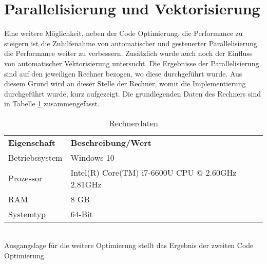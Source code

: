 \section{Parallelisierung und Vektorisierung}
Eine weitere Möglichkeit, neben der Code Optimierung, die Performance zu steigern ist die Zuhilfenahme von automatischer und gesteuerter Parallelisierung \cite{Kessler.Wintersemester201718}  die Performance weiter zu verbessern. Zusätzlich wurde auch noch der Einfluss von automatischer Vektorisierung untersucht. Die Ergebnisse der Parallelisierung sind auf den jeweiligen Rechner bezogen, wo diese durchgeführt wurde. Aus diesem Grund wird an dieser Stelle der Rechner, womit die Implementierung durchgeführt wurde, kurz aufgezeigt. Die grundlegenden Daten des Rechners sind in Tabelle \ref{tab:Rechnerdaten} zusammengefasst.
\begin{table}[h]
	\centering	\begin{tabular}{l p{10cm}}
		\textbf{Eigenschaft} & \textbf{Beschreibung/Wert}\\
		Betriebssystem & Windows 10\\
		Prozessor & Intel(R) Core(TM) i7-6600U CPU @ 2.60GHz 2.81GHz\\
		RAM & 8 GB\\
		Systemtyp & 64-Bit 
	\end{tabular}
	\caption{Rechnerdaten}
	\label{tab:Rechnerdaten}
\end{table}\\
Ausgangslage für die weitere Optimierung stellt das Ergebnis der  zweiten Code Optimierung.
